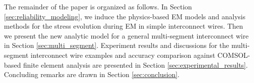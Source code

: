 The remainder of the paper is organized as follows. In Section
\ref{sec:reliability_modeling}, we induce the physics-based EM models
and analysis methods for the stress evolution during EM in simple
interconnect wires. Then we present the new analytic model for a
general multi-segment interconnect wire in Section
\ref{sec:multi_segment}. Experiment results and discussions for the
multi-segment interconnect wire examples and accuracy comparison
against COMSOL-based finite element analysis are presented in Section
\ref{sec:experimental_results}. Concluding remarks are drawn in
Section \ref{sec:conclusion}.



